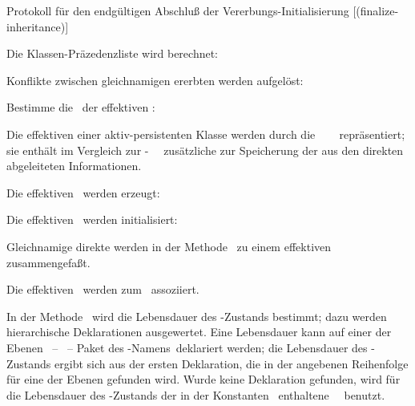 \begin{infol}
%
\captionfrom%
 {Protokoll f\"{u}r den endg\"{u}ltigen Abschlu\ss{} der
  Vererbungs-Initialisierung}%
 {\cite[]{bib:pa91b}}%
 [(finalize-inheritance)]%
 \label{pro:fi}%
\nopagebreak[4]%
%
\item Die Klassen-Pr\"{a}zedenzliste wird berechnet:\\
%
\item Konflikte zwischen gleichnamigen ererbten \Slt[s]\/ werden
aufgel\"{o}st:
%
\begin{block}
%
\item Bestimme die \sltmc\ der effektiven \Slt[s]:\\
\item[\plobmtdchar] Die effektiven \Slt[s]\/ einer
aktiv-persistenten Klasse werden durch die \spc\ \sltmc\ %
\ repr\"{a}sentiert; sie
enth\"{a}lt im Vergleich zur
\std-\sltmc\ %
\ zu\-s\"{a}tz\-li\-che
\Slt[s]\/ zur Speicherung der aus den direkten \Slt[s]\/ abgeleiteten
Informationen.
%
\item Die effektiven \sltmo[e]\ werden erzeugt:\\
%
\item Die effektiven \sltmo[e]\ werden initialisiert:\\
\item[\plobmtdchar] Gleichnamige direkte
\Slt[s]\/ werden in der Methode
\ zu einem effektiven
\Slt\/ zusammengefa\ss{}t.
%
\item Die effektiven \sltmo[e]\ werden zum \clsmo\ assoziiert.
%
\end{block}
%
\end{infol}
%
In der Methode \ wird die
Lebensdauer des \Slt\/-Zustands bestimmt; dazu werden hierarchische
Deklarationen ausgewertet. Eine Lebensdauer kann auf einer der Ebenen
\rglq\Slt\/\rgrq\ -- \rglq\cls\rgrq\ -- \rglq{}Paket des
\cls[n]-Namens\rgrq\  deklariert werden; die Lebensdauer
des \Slt\/-Zustands ergibt sich aus der ersten Deklaration, die
in der angebenen Reihenfolge f\"{u}r eine der Ebenen gefunden wird. Wurde
keine Deklaration gefunden, wird f\"{u}r die Lebensdauer des
\Slt\/-Zustands der in der Konstanten
\ enthaltene
\std[wert]\ \ benutzt. 
%
